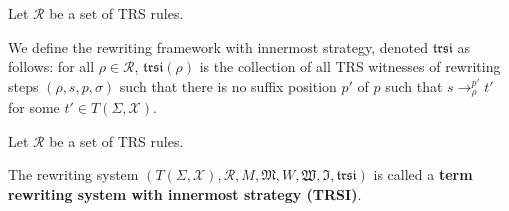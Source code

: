   
  \begin{definition}
    Let $\mathcal{R}$ be a set of TRS rules. 
  
    We define the rewriting framework with innermost strategy, denoted $\mathfrak{trsi}$ as follows: for all $\rho \mathop{\in} \mathcal{R}$, $\mathfrak{trsi}(\rho)$ is the collection of all TRS witnesses of rewriting steps $(\rho, s, p, \sigma)$ such that there is no suffix position $p'$ of $p$ such that $s \mathop{\to} _\rho^{p'} t'$ for some $t' \mathop{\in} T(\Sigma,\mathcal{X})$.
  \end{definition}
  
  \begin{definition}
    Let $\mathcal{R}$ be a set of TRS rules. 
  
    The rewriting system $(T(\Sigma,\mathcal{X}), \mathcal{R}, M, \mathfrak{M}, W, \mathfrak{W}, \mathfrak{I}, \mathfrak{trsi})$ is called a \textbf{term rewriting system with innermost strategy (TRSI)}.
  \end{definition}
  
